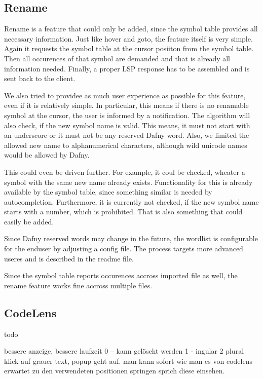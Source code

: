 \subsection{Rename}
Rename is a feature that could only be added, since the symbol table provides all necessary information.
Just like hover and goto, the feature itself is very simple.
Again it requests the symbol table at the cursor posiiton from the symbol table.
Then all occurences of that symbol are demanded and that is already all information needed.
Finally, a proper LSP response has to be assembled and is sent back to the client.

We also tried to providee as much user experience as possible for this feature, even if it is relatively simple.
In particular, this means if there is no renamable symbol at the cursor, the user is informed by a notification.
The algorithm will also check, if the new symbol name is valid.
This means, it must not start with an underscore or it must not be any reserved Dafny word.
Also, we limited the allowed new name to alphanumerical characters, although wild unicode names would be allowed by Dafny.

This could even be driven further. For example, it coul be checked, wheater a symbol with the same new name already exists.
Functionality for this is already available by the symbol table, since something similar is needed by autocompletion.
Furthermore, it is currently not checked, if the new symbol name starts with a number, which is prohibited.
That is also something that could easily be added. 

Since Dafny reserved words may change in the future, the wordlist is configurable for the enduser by adjusting a config file.
The process targets more advanced useres and is described in the readme file.

Since the symbol table reports occurences accross imported file as well, the rename feature works fine accross multiple files.



\subsection{CodeLens}
todo

bessere anzeige, bessere laufzeit
0 -- kann gelöscht werden
1 - ingular
2 plural
 klick auf grauer text, popup geht auf. man kann sofort wie man es von codelens erwartet zu den verwendeten positionen springen sprich diese einsehen.


